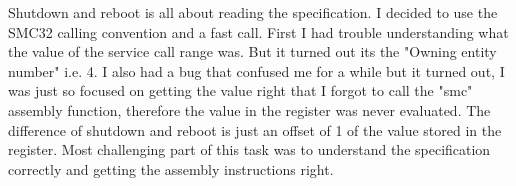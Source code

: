 Shutdown and reboot is all about reading the specification. I decided to use the
SMC32 calling convention and a fast call. First I had trouble understanding what
the value of the service call range was. But it turned out its the "Owning
entity number" i.e. 4. I also had a bug that confused me for a while but it
turned out, I was just so focused on getting the value right that I forgot to
call the "smc" assembly function, therefore the value in the register was never
evaluated.  The difference of shutdown and reboot is just an offset of 1 of the
value stored in the register.  Most challenging part of this task was to
understand the specification correctly and getting the assembly instructions
right.
